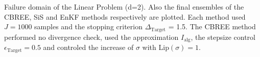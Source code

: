 Failure domain of the Linear Problem (d=2). Also the final ensembles of the CBREE, SiS and EnKF methods respectively are plotted. Each method used $J=1000$ samples and the stopping criterion $\Delta_{\text{Target}}$ = 1.5. The CBREE method performed no divergence check, used the approximation $I_\text{alg}$, the stepsize control $\epsilon_{\text{Target}}=0.5$ and controled the increase of $\sigma$ with $\text{Lip}(\sigma) = 1$.